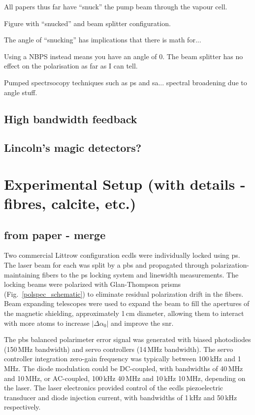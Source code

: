 All papers thus far have ``snuck'' the pump beam through the vapour cell.

Figure with ``snucked'' and beam splitter configuration.

The angle of ``snucking'' has implications that there is math for...

Using a NBPS instead means you have an angle of 0.
The beam splitter has no effect on the polarisation as far as I can tell.

Pumped spectrsocopy techniques such as \gls{ps} and \gls{sa}... spectral broadening due to angle stuff.

\subsection{High bandwidth feedback}
\subsection{Lincoln's magic detectors?}
\section{Experimental Setup (with details - fibres, calcite, etc.)}
\subsection{from paper - merge}
Two commercial Littrow configuration \glspl*{ecdl} \cite{equipment} were individually locked using \gls*{ps}.
The laser beam for each was split by a \gls*{pbs} and propagated through polarization-maintaining fibers to the \gls*{ps} locking system and linewidth measurements.
The locking beams were polarized with Glan-Thompson prisms (Fig.~\ref{polspec_schematic}) to eliminate residual polarization drift in the fibers.
Beam expanding telescopes were used to expand the beam to fill the apertures of the magnetic shielding, approximately 1\,cm diameter, allowing them to interact with more atoms to increase $|\Delta\alpha_0|$ and improve the \gls*{snr}.

The \gls*{pbs} balanced polarimeter error signal was generated with biased photodiodes (150\,MHz bandwidth) and servo controllers (14\,MHz bandwidth).
The servo controller integration zero-gain frequency was typically between 100\,kHz and 1\,MHz.
The diode modulation could be DC-coupled, with bandwidths of 40\,MHz and 10\,MHz, or AC-coupled, 100\,kHz\,\textendash\,40\,MHz and 10\,kHz\,\textendash\,10\,MHz, depending on the laser.
The laser electronics provided control of the \glspl*{ecdl} piezoelectric transducer and diode injection current, with bandwidths of 1\,kHz and 50\,kHz respectively.


